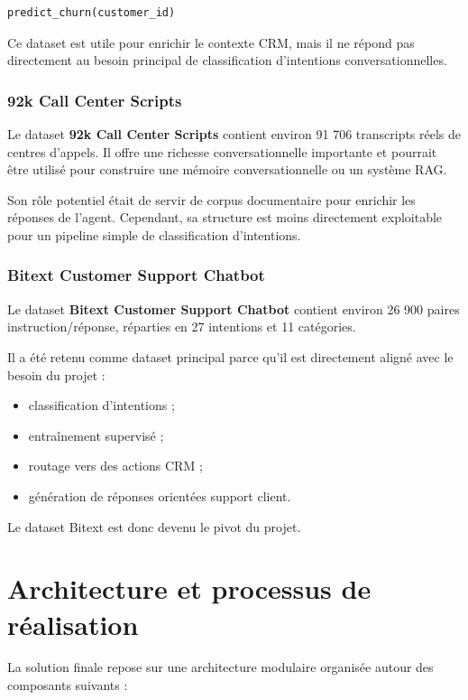 \documentclass[12pt,a4paper]{report}
\begin{document}
\begin{lstlisting}
predict_churn(customer_id)
\end{lstlisting}

Ce dataset est utile pour enrichir le contexte CRM, mais il ne répond pas directement au besoin principal de classification d'intentions conversationnelles.

\subsection{92k Call Center Scripts}

Le dataset \textbf{92k Call Center Scripts} contient environ 91 706 transcripts réels de centres d'appels. Il offre une richesse conversationnelle importante et pourrait être utilisé pour construire une mémoire conversationnelle ou un système RAG.

Son rôle potentiel était de servir de corpus documentaire pour enrichir les réponses de l'agent. Cependant, sa structure est moins directement exploitable pour un pipeline simple de classification d'intentions.

\subsection{Bitext Customer Support Chatbot}

Le dataset \textbf{Bitext Customer Support Chatbot} contient environ 26 900 paires instruction/réponse, réparties en 27 intentions et 11 catégories.

Il a été retenu comme dataset principal parce qu'il est directement aligné avec le besoin du projet :

\begin{itemize}
    \item classification d'intentions ;
    \item entraînement supervisé ;
    \item routage vers des actions CRM ;
    \item génération de réponses orientées support client.
\end{itemize}

Le dataset Bitext est donc devenu le pivot du projet.

\chapter{Architecture et processus de réalisation}

La solution finale repose sur une architecture modulaire organisée autour des composants suivants :
\end{document}
